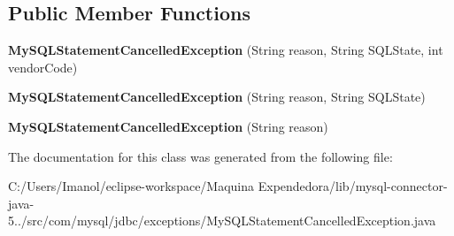 \subsection*{Public Member Functions}
\begin{DoxyCompactItemize}
\item 
\mbox{\label{classcom_1_1mysql_1_1jdbc_1_1exceptions_1_1_my_s_q_l_statement_cancelled_exception_a082e0086eab9d8f743b87cef14d98faa}} 
{\bfseries My\+S\+Q\+L\+Statement\+Cancelled\+Exception} (String reason, String S\+Q\+L\+State, int vendor\+Code)
\item 
\mbox{\label{classcom_1_1mysql_1_1jdbc_1_1exceptions_1_1_my_s_q_l_statement_cancelled_exception_ae9a0174abfdf8512e7982a47c2ebe86e}} 
{\bfseries My\+S\+Q\+L\+Statement\+Cancelled\+Exception} (String reason, String S\+Q\+L\+State)
\item 
\mbox{\label{classcom_1_1mysql_1_1jdbc_1_1exceptions_1_1_my_s_q_l_statement_cancelled_exception_aeca5c669d2647bb62217c92cb84b6395}} 
{\bfseries My\+S\+Q\+L\+Statement\+Cancelled\+Exception} (String reason)
\end{DoxyCompactItemize}


The documentation for this class was generated from the following file\+:\begin{DoxyCompactItemize}
\item 
C\+:/\+Users/\+Imanol/eclipse-\/workspace/\+Maquina Expendedora/lib/mysql-\/connector-\/java-\/5../src/com/mysql/jdbc/exceptions/My\+S\+Q\+L\+Statement\+Cancelled\+Exception.\+java\end{DoxyCompactItemize}
